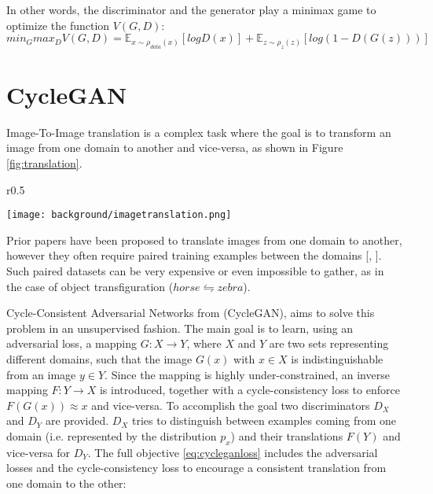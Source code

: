 In other words, the discriminator and the generator play a minimax game to optimize the function $V(G,D)$:
\begin{equation}
  \label{eq:ganloss}
  min_G max_D V(G,D) = \mathbb{E}_{x\sim \rho_{data}(x)}[log D(x)] + \mathbb{E}_{z\sim \rho_{z}(z)}[log (1-D(G(z)))]
\end{equation}

\section{CycleGAN}
Image-To-Image translation is a complex task where the goal is to transform an image from one domain to another and vice-versa, as shown in Figure \ref{fig:translation}.

\begin{wrapfigure}{r}{0.5\textwidth}
  \begin{center}
    \texttt{[image: background/imagetranslation.png]}
  \end{center}
  \caption{Image-to-image translation example \citep{CycleGAN2017}. }
  \label{fig:translation}
\end{wrapfigure}

Prior papers have been proposed to translate images from one domain to another, however they often require paired training examples between the domains [\citet{https://doi.org/10.48550/arxiv.1612.00835}, \citet{karakan}].
Such paired datasets can be very expensive or even impossible to gather, as in the case of object transfiguration ($horse \leftrightharpoons zebra$).

Cycle-Consistent Adversarial Networks from \citet{CycleGAN2017} (CycleGAN), aims to solve this problem in an unsupervised fashion. The main goal is to learn, using an adversarial loss, a mapping $G:X\rightarrow Y$, where $X$ and $Y$ are two sets representing different domains, such that the image $G(x) $ with $x\in X$ is indistinguishable from an image $y\in Y$. Since the mapping is highly under-constrained, an inverse mapping $F:Y \rightarrow X$ is introduced, together with a cycle-consistency loss to enforce $F(G(x)) \approx x$ and vice-versa.
To accomplish the goal two discriminators $D_{X}$ and $D_{Y}$ are provided. $D_{X}$ tries to distinguish between examples coming from one domain (i.e. represented by the distribution $p_{x}$) and their translations $F(Y)$ and vice-versa for $D_{Y}$. 
The full objective \ref{eq:cycleganloss} includes the adversarial losses and the cycle-consistency loss to encourage a consistent translation from one domain to the other:

